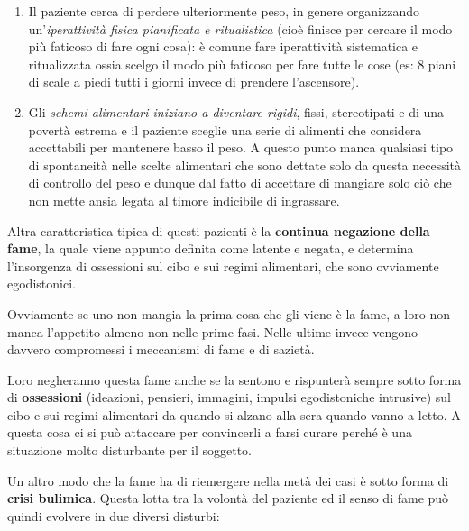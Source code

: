 \documentclass[]{article}
\begin{document}
\begin{enumerate}
\def\labelenumi{\arabic{enumi}.}
\item
  Il paziente cerca di perdere ulteriormente peso, in genere
  organizzando un'\emph{iperattività fisica pianificata e ritualistica}
  (cioè finisce per cercare il modo più faticoso di fare ogni cosa): è
  comune fare iperattività sistematica e ritualizzata ossia scelgo il
  modo più faticoso per fare tutte le cose (es: 8 piani di scale a piedi
  tutti i giorni invece di prendere l'ascensore).
\item
  Gli \emph{schemi alimentari iniziano a diventare rigidi}, fissi,
  stereotipati e di una povertà estrema e il paziente sceglie una serie
  di alimenti che considera accettabili per mantenere basso il peso. A
  questo punto manca qualsiasi tipo di spontaneità nelle scelte
  alimentari che sono dettate solo da questa necessità di controllo del
  peso e dunque dal fatto di accettare di mangiare solo ciò che non
  mette ansia legata al timore indicibile di ingrassare.
\end{enumerate}

Altra caratteristica tipica di questi pazienti è la \textbf{continua
negazione della fame}, la quale viene appunto definita come latente e
negata, e determina l'insorgenza di ossessioni sul cibo e sui regimi
alimentari, che sono ovviamente egodistonici.

Ovviamente se uno non mangia la prima cosa che gli viene è la fame, a
loro non manca l'appetito almeno non nelle prime fasi. Nelle ultime
invece vengono davvero compromessi i meccanismi di fame e di sazietà.

Loro negheranno questa fame anche se la sentono e rispunterà sempre
sotto forma di \textbf{ossessioni} (ideazioni, pensieri, immagini,
impulsi egodistoniche intrusive) sul cibo e sui regimi alimentari da
quando si alzano alla sera quando vanno a letto. A questa cosa ci si può
attaccare per convincerli a farsi curare perché è una situazione molto
disturbante per il soggetto.

Un altro modo che la fame ha di riemergere nella metà dei casi è sotto
forma di \textbf{crisi bulimica}. Questa lotta tra la volontà del
paziente ed il senso di fame può quindi evolvere in due diversi
disturbi:
\end{document}
